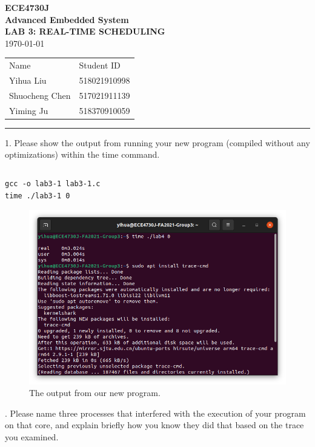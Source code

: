 \documentclass[a4paper]{article}
\begin{document}
\begin{center}
    \huge
    \textbf{ECE4730J\\Advanced Embedded System\\}
    \Large
    \vspace{15pt}
    \uppercase{\textbf{Lab 3: Real-time Scheduling}}\\
    \large
    \vspace{5pt}\today\\
    \vspace{5pt}
    \begin{tabular}{ll}
        Name&Student ID\\
        Yihua Liu&518021910998\\
        Shuocheng Chen&517021911139\\
        Yiming Ju&518370910059\\
    \end{tabular}
    \vspace{5pt}
    \rule[-5pt]{.97\linewidth}{0.05em}
\end{center}
1. Please show the output from running your new program (compiled without any optimizations) within the time command.
\inputminted[frame=single,bgcolor=bg,breaklines,linenos]{c}{lab3-1.c}
\begin{verbatim}
gcc -o lab3-1 lab3-1.c
time ./lab3-1 0
\end{verbatim}
\begin{figure}[H]
    \centering
    \includegraphics[width=1\textwidth]{1.png}
    \caption{The output from our new program.}
\end{figure}
. Please name three processes that interfered with the execution of your program on that core, and explain briefly how you know they did that based on the trace you examined.
\end{document}
